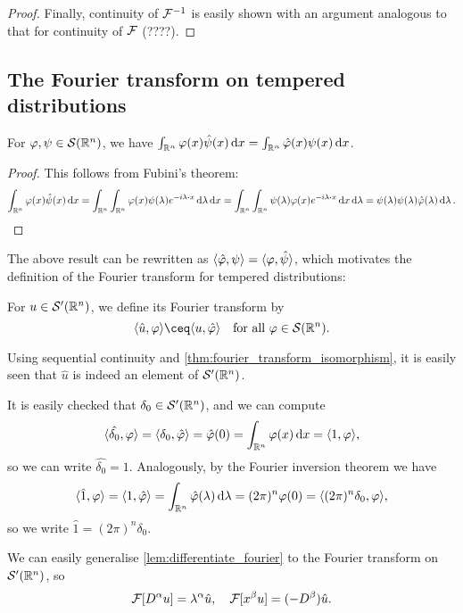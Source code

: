 \begin{proof}
Finally, continuity of $\mathcal F^{-1}$ is easily shown with an argument analogous to that for continuity of $\mathcal F$ (????). 
\end{proof}

\subsection{The Fourier transform on tempered distributions}
\begin{lemma}
	For $\varphi, \psi \in \mathcal S(\mathbb R^n)$, we have $\int_{\mathbb R^n} \varphi(x) \hat\psi(x) \dd{x} = \int_{\mathbb R^n} \hat{\varphi}(x) \psi(x) \dd{x}$. 
\end{lemma}

\begin{proof}
	This follows from Fubini's theorem:
	\[
	\int_{\RR^n}\phi(x) \hat \psi(x) \dd{x} = \int_{\RR^n}\int_{\RR^n} \phi(x) \psi(\lambda) e^{-i\lambda \vdot x} \dd{\lambda} \dd{x} = \int_{\RR^n}\int_{\RR^n} \psi(\lambda)  \phi(x) e^{-i\lambda \vd x} \dd{x} \dd{\lambda} = \psi(\lambda) \psi(\lambda) \hat\phi(\lambda) \dd{\lambda}. 
	\]
\end{proof}

The above result can be rewritten as $\langle\hat{\varphi}, \psi\rangle = \langle\varphi, \hat\psi\rangle$, which motivates the definition of the Fourier transform for tempered distributions:
\begin{definition}
	For $u \in \mathcal S'(\mathbb R^n)$, we define its Fourier transform by
	\[
	\ang{\hat u, \phi} \ceq \ang{u, \hat\phi} \quad\text{for all $\phi \in \SS(\RR^n)$}. 
	\]
\end{definition}
Using sequential continuity and \cref{thm:fourier_transform_isomorphism}, it is easily seen that $\hat u$ is indeed an element of $\mathcal S'(\mathbb R^n)$. 

\begin{example}
	It is easily checked that $\delta_0 \in \mathcal S'(\mathbb R^n)$, and we can compute
	\[
	\langle\hat{\delta_0}, \varphi\rangle = \langle\delta_0, \hat{\varphi}\rangle = \hat{\varphi}(0) = \int_{\mathbb R^n} \varphi(x) \dd{x} = \langle1, \varphi\rangle,
	\]
	so we can write $\hat{\delta_0} = 1$. Analogously, by the Fourier inversion theorem we have
	\[
	\langle\hat 1, \varphi\rangle = \langle1, \hat{\varphi}\rangle = \int_{\mathbb R^n} \hat{\varphi}(\lambda) \dd{\lambda} = (2\pi)^n \varphi(0) = \langle(2\pi)^n \delta_0, \varphi\rangle, 
	\]
	so we write $\hat 1 = (2\pi)^n \delta_0$. 
\end{example}

We can easily generalise \cref{lem:differentiate_fourier} to the Fourier transform on $\mathcal S'(\mathbb R^n)$, so
\[
\mathcal F[D^\alpha u] = \lambda^\alpha \hat u, \quad \mathcal F[x^\beta u] = (-D^\beta) \hat u. 
\]

